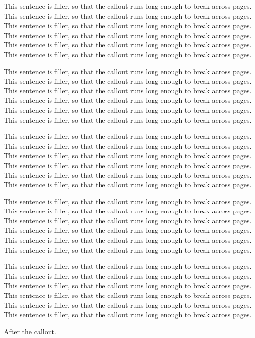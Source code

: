 \begin{tcolorbox}
This sentence is filler, so that the callout runs long enough to break across pages. This sentence is filler, so that the callout runs long enough to break across pages. This sentence is filler, so that the callout runs long enough to break across pages. This sentence is filler, so that the callout runs long enough to break across pages. This sentence is filler, so that the callout runs long enough to break across pages. This sentence is filler, so that the callout runs long enough to break across pages.

This sentence is filler, so that the callout runs long enough to break across pages. This sentence is filler, so that the callout runs long enough to break across pages. This sentence is filler, so that the callout runs long enough to break across pages. This sentence is filler, so that the callout runs long enough to break across pages. This sentence is filler, so that the callout runs long enough to break across pages. This sentence is filler, so that the callout runs long enough to break across pages.

This sentence is filler, so that the callout runs long enough to break across pages. This sentence is filler, so that the callout runs long enough to break across pages. This sentence is filler, so that the callout runs long enough to break across pages. This sentence is filler, so that the callout runs long enough to break across pages. This sentence is filler, so that the callout runs long enough to break across pages. This sentence is filler, so that the callout runs long enough to break across pages.

This sentence is filler, so that the callout runs long enough to break across pages. This sentence is filler, so that the callout runs long enough to break across pages. This sentence is filler, so that the callout runs long enough to break across pages. This sentence is filler, so that the callout runs long enough to break across pages. This sentence is filler, so that the callout runs long enough to break across pages. This sentence is filler, so that the callout runs long enough to break across pages.

This sentence is filler, so that the callout runs long enough to break across pages. This sentence is filler, so that the callout runs long enough to break across pages. This sentence is filler, so that the callout runs long enough to break across pages. This sentence is filler, so that the callout runs long enough to break across pages. This sentence is filler, so that the callout runs long enough to break across pages. This sentence is filler, so that the callout runs long enough to break across pages.
\end{tcolorbox}

After the callout.

